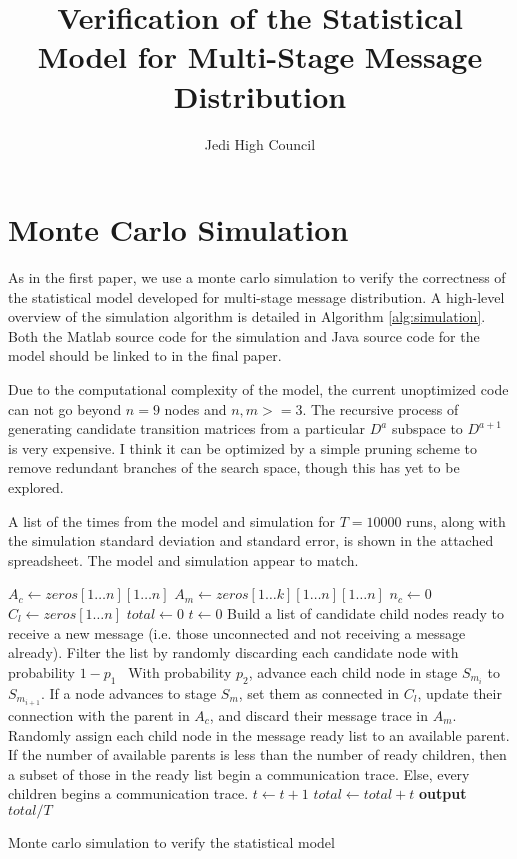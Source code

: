 \documentclass[12pt]{article}
\title{Verification of the Statistical Model for Multi-Stage Message Distribution}
\author{Jedi High Council}
\begin{document}
\maketitle

\section{Monte Carlo Simulation}

As in the first paper, we use a monte carlo simulation to verify the correctness of the statistical model developed for multi-stage message distribution. A high-level overview of the simulation algorithm is detailed in Algorithm \ref{alg:simulation}. Both the Matlab source code for the simulation and Java source code for the model should be linked to in the final paper.

Due to the computational complexity of the model, the current unoptimized code can not go beyond $n = 9$ nodes and $n, m >= 3$. The recursive process of generating candidate transition matrices from a particular $D^a$ subspace to $D^{a+1}$ is very expensive. I think it can be optimized by a simple pruning scheme to remove redundant branches of the search space, though this has yet to be explored. 

A list of the times from the model and simulation for $T = 10000$ runs, along with the simulation standard deviation and standard error, is shown in the attached spreadsheet. The model and simulation appear to match. 

\begin{algorithm}[H] \label{alg:simulation}
  \SetAlgoLined
  	$A_c \gets zeros[1\dots n][1\dots n]$\;
    $A_m \gets zeros[1\dots k][1\dots n][1\dots n]$\;
    $n_c \gets 0$\;
    $C_l \gets zeros[1\dots n]$\;
    $total \gets 0$\;
	 {
    	$t \gets 0$\;
    	 {
        	Build a list of candidate child nodes ready to receive a new message (i.e. those unconnected and not receiving a message already). Filter the list by randomly discarding each candidate node with probability $1 - p_1$\
             {
            	With probability $p_2$, advance each child node in stage $S_{m_i}$ to $S_{m_{i+1}}$. If a node advances to stage $S_m$, set them as connected in $C_l$, update their connection with the parent in $A_c$, and discard their message trace in $A_m$.\;
        	}
            Randomly assign each child node in the message ready list to an available parent. If the number of available parents is less than the number of ready children, then a subset of those in the ready list begin a communication trace. Else, every children begins a communication trace.\;
            $t \gets t + 1$\;
        }
        $total \gets total + t$\;
    }
    \textbf{output} $total / T$
  \caption{Monte carlo simulation to verify the statistical model}
\end{algorithm}
\end{document}

